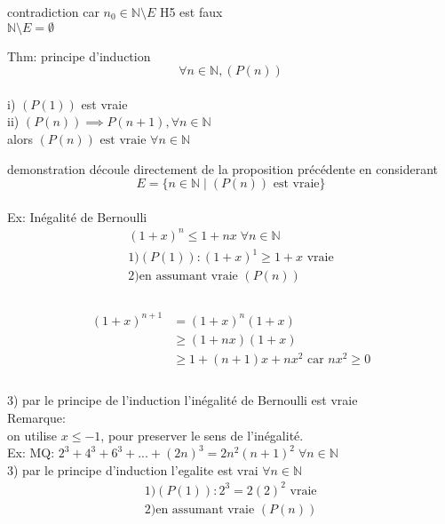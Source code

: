 \documentclass{article}
\newcommand{\naturals}{\mathbb{N}}
\begin{document}
contradiction car $n_0 \in \naturals \setminus E$
H5 est faux\\
$\naturals \setminus E = \emptyset$

Thm: principe d'induction\\
$$\forall n \in \naturals, (P(n))$$\\
i) $(P(1))$ est vraie\\
ii) $(P(n)) \implies P(n + 1), \forall n \in \naturals$ \\
alors $(P(n)) \text{ est vraie } \forall n \in \naturals$

demonstration découle directement de la proposition précédente en considerant
$$E = \{n \in \naturals \; | \; (P(n)) \text{ est vraie}\}$$\\

Ex: Inégalité de Bernoulli \\
\begin{equation}
\begin{aligned}
(1 + x)^n \le 1 + nx \; \forall n \in \naturals\\
1) (P(1)): (1 + x)^1 \ge 1 + x \text{ vraie} \\
2) \text{en assumant vraie } (P(n)) \\
\end{aligned}
\end{equation}\\

\begin{equation}
\begin{aligned}
(1 + x)^{n + 1} &= (1 + x)^n (1 + x) \\
&\ge (1 + nx)(1 + x)\\
&\ge 1 + (n + 1)x + n x ^2 \text{ car } nx ^2 \ge 0\\
\end{aligned}
\end{equation}\\
3) par le principe de l'induction l’inégalité de Bernoulli est vraie\\
 
Remarque: \\
on utilise $x \le -1$, pour preserver le sens de l’inégalité.\\

Ex: MQ: $2^3 + 4^3 + 6^3 + ... + (2n)^3 = 2n^2(n+1)^2 \; \forall n \in \naturals$\\
3) par le principe d'induction l'egalite est vrai $\forall n \in \naturals$\\
\begin{equation}
\begin{aligned}
1) (P(1)):  2^3 = 2(2)^2\text{ vraie} \\
2) \text{en assumant vraie } (P(n)) \\
\end{aligned}
\end{equation}\\
\end{document}
